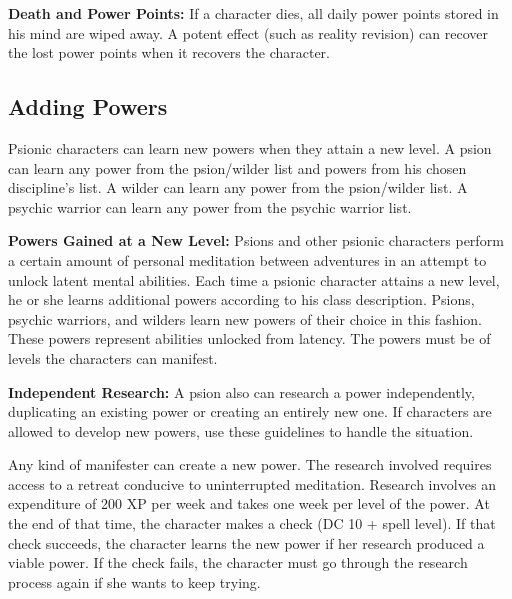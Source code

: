 \textbf{Death and Power Points:} If a character dies, all daily power points stored in his mind are wiped away. A potent effect (such as reality revision) can recover the lost power points when it recovers the character.

\subsection{Adding Powers}
Psionic characters can learn new powers when they attain a new level. A psion can learn any power from the psion/wilder list and powers from his chosen discipline's list. A wilder can learn any power from the psion/wilder list. A psychic warrior can learn any power from the psychic warrior list.

\textbf{Powers Gained at a New Level:} Psions and other psionic characters perform a certain amount of personal meditation between adventures in an attempt to unlock latent mental abilities. Each time a psionic character attains a new level, he or she learns additional powers according to his class description. Psions, psychic warriors, and wilders learn new powers of their choice in this fashion. These powers represent abilities unlocked from latency. The powers must be of levels the characters can manifest.

\textbf{Independent Research:} A psion also can research a power independently, duplicating an existing power or creating an entirely new one. If characters are allowed to develop new powers, use these guidelines to handle the situation.

Any kind of manifester can create a new power. The research involved requires access to a retreat conducive to uninterrupted meditation. Research involves an expenditure of 200 XP per week and takes one week per level of the power. At the end of that time, the character makes a  check (DC 10 + spell level). If that check succeeds, the character learns the new power if her research produced a viable power. If the check fails, the character must go through the research process again if she wants to keep trying.

